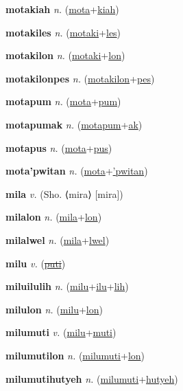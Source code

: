 \textbf{\hypertarget{motakiah}{motakiah}} \textit{n.} (\hyperlink{mota}{mota}+\allowbreak \hyperlink{kiah}{kiah})


\textbf{\hypertarget{motakiles}{motakiles}} \textit{n.} (\hyperlink{motaki}{motaki}+\allowbreak \hyperlink{les}{les})


\textbf{\hypertarget{motakilon}{motakilon}} \textit{n.} (\hyperlink{motaki}{motaki}+\allowbreak \hyperlink{lon}{lon})


\textbf{\hypertarget{motakilonpes}{motakilonpes}} \textit{n.} (\hyperlink{motakilon}{motakilon}+\allowbreak \hyperlink{pes}{pes})


\textbf{\hypertarget{motapum}{motapum}} \textit{n.} (\hyperlink{mota}{mota}+\allowbreak \hyperlink{pum}{pum})


\textbf{\hypertarget{motapumak}{motapumak}} \textit{n.} (\hyperlink{motapum}{motapum}+\allowbreak \hyperlink{ak}{ak})


\textbf{\hypertarget{motapus}{motapus}} \textit{n.} (\hyperlink{mota}{mota}+\allowbreak \hyperlink{pus}{pus})


\textbf{\hypertarget{mota'pwitan}{mota'pwitan}} \textit{n.} (\hyperlink{mota}{mota}+\allowbreak \hyperlink{'pwitan}{'pwitan})


\textbf{\hypertarget{mila}{mila}} \textit{v.} (Sho. ⟨mira⟩ [mira])


\textbf{\hypertarget{milalon}{milalon}} \textit{n.} (\hyperlink{mila}{mila}+\allowbreak \hyperlink{lon}{lon})


\textbf{\hypertarget{milalwel}{milalwel}} \textit{n.} (\hyperlink{mila}{mila}+\allowbreak \hyperlink{lwel}{lwel})


\textbf{\hypertarget{milu}{milu}} \textit{v.} (\hyperlink{puti}{\sout{puti}})


\textbf{\hypertarget{miluilulih}{miluilulih}} \textit{n.} (\hyperlink{milu}{milu}+\allowbreak \hyperlink{ilu}{ilu}+\allowbreak \hyperlink{lih}{lih})


\textbf{\hypertarget{milulon}{milulon}} \textit{n.} (\hyperlink{milu}{milu}+\allowbreak \hyperlink{lon}{lon})


\textbf{\hypertarget{milumuti}{milumuti}} \textit{v.} (\hyperlink{milu}{milu}+\allowbreak \hyperlink{muti}{muti})


\textbf{\hypertarget{milumutilon}{milumutilon}} \textit{n.} (\hyperlink{milumuti}{milumuti}+\allowbreak \hyperlink{lon}{lon})


\textbf{\hypertarget{milumutihutyeh}{milumutihutyeh}} \textit{n.} (\hyperlink{milumuti}{milumuti}+\allowbreak \hyperlink{hutyeh}{hutyeh})


